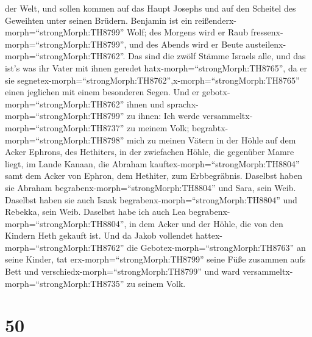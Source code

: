 der Welt, und sollen kommen auf das Haupt Josephs und auf den Scheitel
des Geweihten unter seinen Brüdern.  Benjamin ist ein
reißenderx-morph=``strongMorph:TH8799'' Wolf; des Morgens wird er Raub
fressenx-morph=``strongMorph:TH8799'', und des Abends wird er Beute
austeilenx-morph=``strongMorph:TH8762''.  Das sind die
zwölf Stämme Israels alle, und das ist's was ihr Vater mit ihnen geredet
hatx-morph=``strongMorph:TH8765'', da er sie
segnetex-morph=``strongMorph:TH8762'',x-morph=``strongMorph:TH8765''
einen jeglichen mit einem besonderen Segen.  Und er
gebotx-morph=``strongMorph:TH8762'' ihnen und
sprachx-morph=``strongMorph:TH8799'' zu ihnen: Ich werde
versammeltx-morph=``strongMorph:TH8737'' zu meinem Volk;
begrabtx-morph=``strongMorph:TH8798'' mich zu meinen Vätern in der Höhle
auf dem Acker Ephrons, des Hethiters,  in der zwiefachen
Höhle, die gegenüber Mamre liegt, im Lande Kanaan, die Abraham
kauftex-morph=``strongMorph:TH8804'' samt dem Acker von Ephron, dem
Hethiter, zum Erbbegräbnis.  Daselbst haben sie Abraham
begrabenx-morph=``strongMorph:TH8804'' und Sara, sein Weib. Daselbst
haben sie auch Isaak begrabenx-morph=``strongMorph:TH8804'' und Rebekka,
sein Weib. Daselbst habe ich auch Lea
begrabenx-morph=``strongMorph:TH8804'',  in dem Acker und
der Höhle, die von den Kindern Heth gekauft ist.  Und da
Jakob vollendet hattex-morph=``strongMorph:TH8762'' die
Gebotex-morph=``strongMorph:TH8763'' an seine Kinder, tat
erx-morph=``strongMorph:TH8799'' seine Füße zusammen aufs Bett und
verschiedx-morph=``strongMorph:TH8799'' und ward
versammeltx-morph=``strongMorph:TH8735'' zu seinem Volk.

\hypertarget{section-49}{%
\section{50}\label{section-49}}

